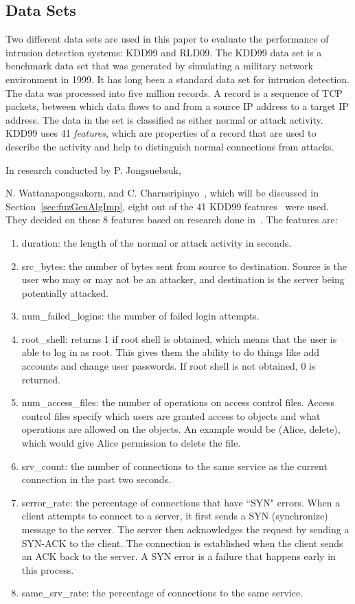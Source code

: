 \documentclass{sig-alternate}
\begin{document}
\subsection{Data Sets}
\label{sec:dataSets}
Two different data sets are used in this paper to evaluate the performance of intrusion detection systems: KDD99 and RLD09. The KDD99 data set is a benchmark data set that was generated by simulating a military network environment in 1999. It has long been a standard data set for intrusion detection. The data was processed into five million records. A record is a sequence of TCP packets, between which data flows to and from a source IP address to a target IP address. The data in the set is classified as either normal or attack activity. KDD99 uses 41 \emph{features}, which are properties of a record that are used to describe the activity and help to distinguish normal connections from attacks.~\cite{KDD99}

In research conducted by P. Jongsuebsuk, 

N. Wattanapongsakorn, and
C. Charnsripinyo~\cite{6496342, 6559603}, which will be discussed in Section~\ref{sec:fuzGenAlgImp}, eight out of the 41 KDD99 features~\cite{KDD99} were used. They decided on these 8 features based on research done in~\cite{Fries:2008:FAN:1388969.1389037}. The features are:
\begin{enumerate}
  \item duration: the length of the normal or attack activity in seconds.
  \item src\_bytes: the number of bytes sent from source to destination. Source is the user who may or may not be an attacker, and destination is the server being potentially attacked.
  \item num\_failed\_logins: the number of failed login attempts.
  \item root\_shell: returns 1 if root shell is obtained, which means that the user is able to log in as root. This gives them the ability to do things like add accounts and change user passwords. If root shell is not obtained, 0 is returned.
  \item num\_access\_files: the number of operations on access control files. Access control files specify which users are granted access to objects and what operations are allowed on the objects. An example would be (Alice, delete), which would give Alice permission to delete the file.~\cite{accessControl}
  \item srv\_count: the number of connections to the same service as the current connection in the past two seconds.
  \item serror\_rate: the percentage of connections that have ``SYN" errors. When a client attempts to connect to a server, it first sends a SYN (synchronize) message to the server. The server then acknowledges the request by sending a SYN-ACK to the client. The connection is established when the client sends an ACK back to the server. A SYN error is a failure that happens early in this process.~\cite{TCP}
  \item same\_srv\_rate: the percentage of connections to the same service.
\end{enumerate}
\end{document}
